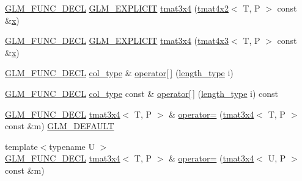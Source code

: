 \begin{DoxyCompactItemize}
\item 
\mbox{\hyperlink{setup_8hpp_ab2d052de21a70539923e9bcbf6e83a51}{G\+L\+M\+\_\+\+F\+U\+N\+C\+\_\+\+D\+E\+CL}} \mbox{\hyperlink{setup_8hpp_a6c74f5a5e7b134ab69023ff9a30d4d5d}{G\+L\+M\+\_\+\+E\+X\+P\+L\+I\+C\+IT}} \mbox{\hyperlink{structglm_1_1tmat3x4_a70babe3ae60656b3cbe053ef31327e13}{tmat3x4}} (\mbox{\hyperlink{structglm_1_1tmat4x2}{tmat4x2}}$<$ T, P $>$ const \&\mbox{\hyperlink{glad_8h_a92d0386e5c19fb81ea88c9f99644ab1d}{x}})
\item 
\mbox{\hyperlink{setup_8hpp_ab2d052de21a70539923e9bcbf6e83a51}{G\+L\+M\+\_\+\+F\+U\+N\+C\+\_\+\+D\+E\+CL}} \mbox{\hyperlink{setup_8hpp_a6c74f5a5e7b134ab69023ff9a30d4d5d}{G\+L\+M\+\_\+\+E\+X\+P\+L\+I\+C\+IT}} \mbox{\hyperlink{structglm_1_1tmat3x4_aadf667324b7352d8aadc7bf0680164e1}{tmat3x4}} (\mbox{\hyperlink{structglm_1_1tmat4x3}{tmat4x3}}$<$ T, P $>$ const \&\mbox{\hyperlink{glad_8h_a92d0386e5c19fb81ea88c9f99644ab1d}{x}})
\item 
\mbox{\hyperlink{setup_8hpp_ab2d052de21a70539923e9bcbf6e83a51}{G\+L\+M\+\_\+\+F\+U\+N\+C\+\_\+\+D\+E\+CL}} \mbox{\hyperlink{structglm_1_1tmat3x4_aa4c8d5353d59216a2f0566ce462fbc81}{col\+\_\+type}} \& \mbox{\hyperlink{structglm_1_1tmat3x4_adba2ef1be4b50bfaa63e5469310f1d87}{operator\mbox{[}$\,$\mbox{]}}} (\mbox{\hyperlink{structglm_1_1tmat3x4_ab857d16b90719de3b23d4fa423d20698}{length\+\_\+type}} i)
\item 
\mbox{\hyperlink{setup_8hpp_ab2d052de21a70539923e9bcbf6e83a51}{G\+L\+M\+\_\+\+F\+U\+N\+C\+\_\+\+D\+E\+CL}} \mbox{\hyperlink{structglm_1_1tmat3x4_aa4c8d5353d59216a2f0566ce462fbc81}{col\+\_\+type}} const  \& \mbox{\hyperlink{structglm_1_1tmat3x4_af1fbec08dc06186ec67fb79ceffa3e25}{operator\mbox{[}$\,$\mbox{]}}} (\mbox{\hyperlink{structglm_1_1tmat3x4_ab857d16b90719de3b23d4fa423d20698}{length\+\_\+type}} i) const
\item 
\mbox{\hyperlink{setup_8hpp_ab2d052de21a70539923e9bcbf6e83a51}{G\+L\+M\+\_\+\+F\+U\+N\+C\+\_\+\+D\+E\+CL}} \mbox{\hyperlink{structglm_1_1tmat3x4}{tmat3x4}}$<$ T, P $>$ \& \mbox{\hyperlink{structglm_1_1tmat3x4_abc0355942efae7b2f19e863908c76036}{operator=}} (\mbox{\hyperlink{structglm_1_1tmat3x4}{tmat3x4}}$<$ T, P $>$ const \&m) \mbox{\hyperlink{setup_8hpp_aefce7051c376a64ba89fa93a9f63bc2c}{G\+L\+M\+\_\+\+D\+E\+F\+A\+U\+LT}}
\item 
{\footnotesize template$<$typename U $>$ }\\\mbox{\hyperlink{setup_8hpp_ab2d052de21a70539923e9bcbf6e83a51}{G\+L\+M\+\_\+\+F\+U\+N\+C\+\_\+\+D\+E\+CL}} \mbox{\hyperlink{structglm_1_1tmat3x4}{tmat3x4}}$<$ T, P $>$ \& \mbox{\hyperlink{structglm_1_1tmat3x4_a966fd086e06ed72bed9db6e362ac5cd4}{operator=}} (\mbox{\hyperlink{structglm_1_1tmat3x4}{tmat3x4}}$<$ U, P $>$ const \&m)

\end{DoxyCompactItemize}
